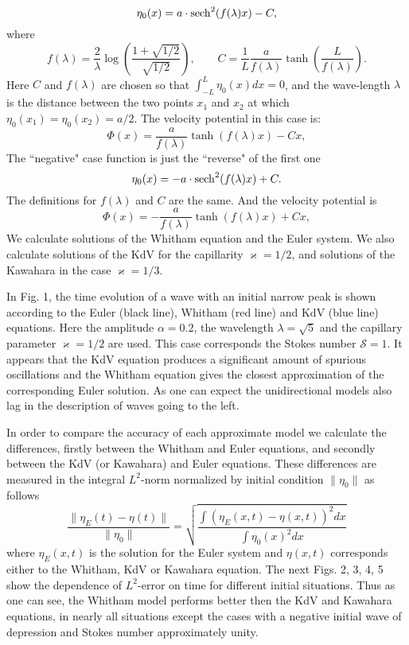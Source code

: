 %
\begin{equation}
\label{test_1}
	\eta_0(x) = a\cdot \operatorname{sech}^2(f(\lambda)x)-C, 
\end{equation}
%
where 
%
\[
	f(\lambda) = \frac{2}{ \lambda }
	\log \left( \frac{ 1 + \sqrt{1/2} }{ \sqrt{1/2} } \right)
	, \qquad
	C = \frac{1}{L}\frac{a}{f(\lambda)}\tanh \left(\frac{L}{f(\lambda)}\right)
	.
\]
%
Here $C$ and $f(\lambda)$ are chosen so that 
$\int_{-L}^{L}\eta_0(x)dx = 0$, and
the wave-length $\lambda$
is the distance between the two points $x_1$ and $x_2$
at which $\eta_0(x_1) = \eta_0(x_2) = a/2$.
The velocity potential in this case is:
%
\begin{equation}
\label{velocity1}
	\Phi(x) = \frac{a}{f(\lambda)}\tanh(f(\lambda)x)-Cx
	,
\end{equation}
%
The ``negative" case function is just the ``reverse" of the first one
%
\begin{equation}
\label{test_2}
	\eta_0(x) = - a\cdot \operatorname{sech}^2(f(\lambda)x) + C
	. 
\end{equation}
%
The definitions for $f(\lambda)$ and $C$ are the same.
And the velocity potential is
%
\begin{equation}
\label{velocity2}
	\Phi(x) = -\frac{a}{f(\lambda)}\tanh(f(\lambda)x)+Cx
	,
\end{equation}
%
We calculate solutions of the Whitham equation and the Euler system.
We also calculate solutions of the KdV for the capillarity $\varkappa = 1/2$,
and solutions of the Kawahara in the case $\varkappa = 1/3$.

In Fig. 1,
the time evolution of a wave with an initial narrow peak is shown according to
the Euler (black line), Whitham (red line) and KdV (blue line) equations. 
Here the amplitude $\alpha = 0.2$,
the wavelength $\lambda = \sqrt{5}$ and the capillary parameter $\varkappa = 1/2$
are used.
This case corresponds the Stokes number $\mathcal S = 1$.
It appears that the KdV equation
produces a significant amount of spurious oscillations
and the Whitham equation gives the closest approximation of
the corresponding Euler solution.
As one can expect the unidirectional models 
also lag in the description of
waves going to the left.

In order to compare the accuracy of each approximate model
we calculate the differences, firstly between the Whitham and Euler equations,
and secondly between the KdV (or Kawahara) and Euler equations.
These differences are measured in the integral $L^2$-norm
normalized by initial condition $\lVert \eta_0 \rVert$ as follows
%
\[
	\frac{ \lVert \eta_E(t) - \eta(t) \rVert }{ \lVert \eta_0 \rVert }
	=
	\sqrt
	{
		\frac{ \int ( \eta_E(x, t) - \eta(x, t) )^2 dx }{ \int \eta_0(x)^2 dx }
	}
\]
%
where $ \eta_E(x, t) $ is the solution for the Euler system
and $ \eta(x, t) $ corresponds either to the Whitham, KdV or Kawahara equation.
The next Figs. 2, 3, 4, 5 show the dependence of $L^2$-error on time for different
initial situations. Thus as one can see, the Whitham model
performs better then the KdV and Kawahara equations,
in nearly all situations except the cases with a negative initial wave of depression
and Stokes number approximately unity.
